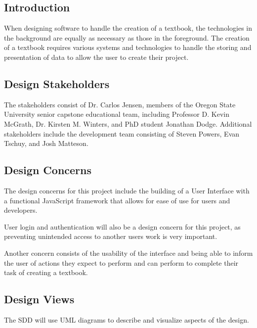 \documentclass[letterpaper, 10pt, draftclsnofoot, compsoc, onecolumn]{IEEEtran}
\begin{document}
\subsection{Introduction}
{\noindent When designing software to handle the creation of a textbook,
the technologies in the background are equally as necessary as those in the foreground.
The creation of a textbook requires various systems and technologies to handle
the storing and presentation of data to allow the user to create their project.\par}


\subsection{Design Stakeholders}
{\noindent The stakeholders consist of Dr. Carlos Jensen, members of the Oregon
State University senior capstone educational team, including Professor D. Kevin McGrath,
Dr. Kirsten M. Winters, and PhD student Jonathan Dodge.
Additional stakeholders include the development team consisting of Steven Powers,
Evan Tschuy, and Josh Matteson.\par}

\subsection{Design Concerns}
{\noindent The design concerns for this project include the building of a User Interface
with a functional JavaScript framework that allows for ease of use for users and developers.

User login and authentication will also be a design concern for this project,
as preventing unintended access to another users work is very important.

Another concern consists of the usability of the interface and being able
to inform the user of actions they expect to perform and can perform to
complete their task of creating a textbook. \par}

\subsection{Design Views}
{\noindent The SDD will use UML diagrams to describe and visualize aspects of the design. \par}
\end{document}
